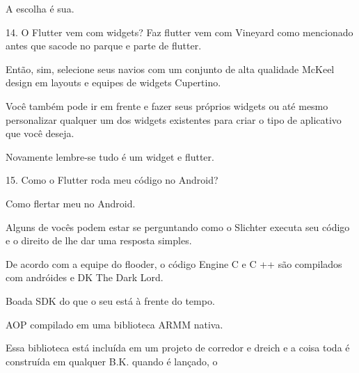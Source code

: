 A escolha é sua.


14. O Flutter vem com widgets?
Faz flutter vem com Vineyard como mencionado antes que sacode no parque e parte de flutter.

Então, sim, selecione seus navios com um conjunto de alta qualidade McKeel design em layouts e equipes de widgets Cupertino.

Você também pode ir em frente e fazer seus próprios widgets ou até mesmo personalizar qualquer um dos widgets existentes para criar o tipo de aplicativo que você deseja.

Novamente lembre-se tudo é um widget e flutter.


15. Como o Flutter roda meu código no Android?

Como flertar meu no Android.

Alguns de vocês podem estar se perguntando como o Slichter executa seu código e o direito de lhe dar uma resposta simples.

De acordo com a equipe do flooder, o código Engine C e C ++ são compilados com andróides e DK The Dark Lord.

Boada SDK do que o seu está à frente do tempo.

AOP compilado em uma biblioteca ARMM nativa.

Essa biblioteca está incluída em um projeto de corredor e dreich e a coisa toda é construída em qualquer B.K. quando é lançado, o
